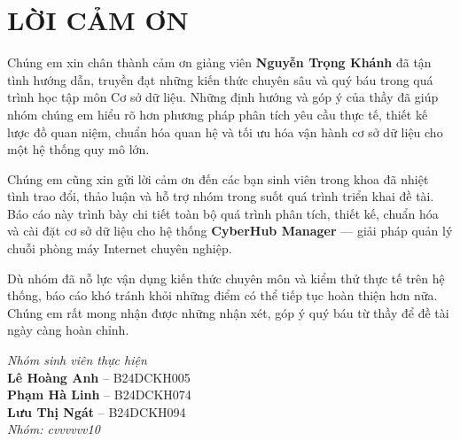 \chapter*{LỜI CẢM ƠN}

Chúng em xin chân thành cảm ơn giảng viên \textbf{Nguyễn Trọng Khánh} đã tận tình hướng dẫn, truyền đạt những kiến thức chuyên sâu và quý báu trong quá trình học tập môn Cơ sở dữ liệu. Những định hướng và góp ý của thầy đã giúp nhóm chúng em hiểu rõ hơn phương pháp phân tích yêu cầu thực tế, thiết kế lược đồ quan niệm, chuẩn hóa quan hệ và tối ưu hóa vận hành cơ sở dữ liệu cho một hệ thống quy mô lớn.

Chúng em cũng xin gửi lời cảm ơn đến các bạn sinh viên trong khoa đã nhiệt tình trao đổi, thảo luận và hỗ trợ nhóm trong suốt quá trình triển khai đề tài. Báo cáo này trình bày chi tiết toàn bộ quá trình phân tích, thiết kế, chuẩn hóa và cài đặt cơ sở dữ liệu cho hệ thống \textbf{CyberHub Manager} --- giải pháp quản lý chuỗi phòng máy Internet chuyên nghiệp.

Dù nhóm đã nỗ lực vận dụng kiến thức chuyên môn và kiểm thử thực tế trên hệ thống, báo cáo khó tránh khỏi những điểm có thể tiếp tục hoàn thiện hơn nữa. Chúng em rất mong nhận được những nhận xét, góp ý quý báu từ thầy để đề tài ngày càng hoàn chỉnh.

\begin{flushright}
\textit{Nhóm sinh viên thực hiện}\\[0.4cm]
\textbf{Lê Hoàng Anh} -- B24DCKH005\\[0.15cm]
\textbf{Phạm Hà Linh} -- B24DCKH074\\[0.15cm]
\textbf{Lưu Thị Ngát} -- B24DCKH094\\[0.25cm]
\textit{Nhóm: cvvvvvv10}
\end{flushright}
\clearpage
